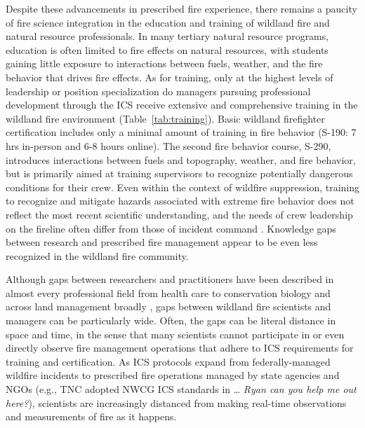 \documentclass[fire,article,submit,moreauthors,pdftex]{Definitions/mdpi}
\begin{document}
Despite these advancements in prescribed fire experience, there remains a paucity of fire science integration in the education and training of wildland fire and natural resource professionals.
In many tertiary natural resource programs, education is often limited to fire effects on natural resources, with students gaining little exposure to interactions between fuels, weather, and the fire behavior that drives fire effects.
As for training, only at the highest levels of leadership or position specialization do managers pursuing professional development through the ICS receive extensive and comprehensive training in the wildland fire environment (Table~\ref{tab:training}).
Basic wildland firefighter certification includes only a minimal amount of training in fire behavior (S-190: 7 hrs in-person and 6-8 hours online).
The second fire behavior course, S-290, introduces interactions between fuels and topography, weather, and fire behavior, but is primarily aimed at training supervisors to recognize potentially dangerous conditions for their crew.
Even within the context of wildfire suppression, training to recognize and mitigate hazards associated with extreme fire behavior does not reflect the most recent scientific understanding, and the needs of crew leadership on the fireline often differ from those of incident command \citep{werth2016}.
Knowledge gaps between research and prescribed fire management appear to be even less recognized in the wildland fire community.

Although gaps between researchers and practitioners have been described in almost every professional field from health care to conservation biology \citep{stott2012, prendergast1999} and across land management broadly \citep{carter2020}, gaps between wildland fire scientists and managers can be particularly wide.
Often, the gaps can be literal distance in space and time, in the sense that many scientists cannot participate in or even directly observe fire management operations that adhere to ICS requirements for training and certification.
As ICS protocols expand from federally-managed wildfire incidents to prescribed fire operations managed by state agencies and NGOs (e.g., TNC adopted NWCG ICS standards in \ldots{} \emph{Ryan can you help me out here?}), scientists are increasingly distanced from making real-time observations and measurements of fire as it happens.
\end{document}
